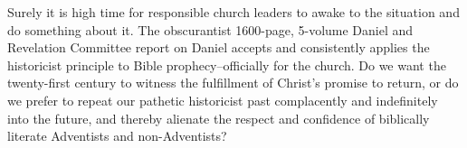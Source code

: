 Surely it is high time for responsible church leaders to awake to the
situation and do something about it. The obscurantist 1600-page, 5-volume
Daniel and Revelation Committee report on Daniel accepts and consistently
applies the historicist principle to Bible prophecy--officially for the
church. Do we want the twenty-first century to witness the fulfillment of
Christ's promise to return, or do we prefer to repeat our pathetic
historicist past complacently and indefinitely into the future, and thereby
alienate the respect and confidence of biblically literate Adventists and
non-Adventists?

